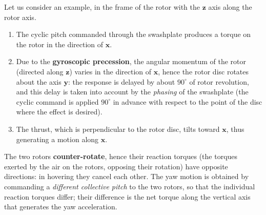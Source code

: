 \documentclass[10pt, a4paper]{report}
\begin{document}
Let us consider an example, in the frame of the rotor with the $\mathbf z$ axis along the rotor axis.
\begin{enumerate}
    \item The cyclic pitch commanded through the swashplate produces a torque on the rotor in the direction of $\mathbf x$.
    \item Due to the \textbf{gyroscopic precession}, the angular momentum of the rotor (directed along $\mathbf z$) varies in the direction of $\mathbf x$, hence the rotor disc rotates about the axis $\mathbf y$: the response is delayed by about $90^\circ$ of rotor revolution, and this delay is taken into account by the \textit{phasing} of the swashplate (the cyclic command is applied $90^\circ$ in advance with respect to the point of the disc where the effect is desired).
    \item The thrust, which is perpendicular to the rotor disc, tilts toward $\mathbf x$, thus generating a motion along $\mathbf x$.
\end{enumerate}
The two rotors \textbf{counter-rotate}, hence their reaction torques (the torques exerted by the air on the rotors, opposing their rotation) have opposite directions: in hovering they cancel each other. The yaw motion is obtained by commanding a \textit{different collective pitch} to the two rotors, so that the individual reaction torques differ; their difference is the net torque along the vertical axis that generates the yaw acceleration.
\end{document}

